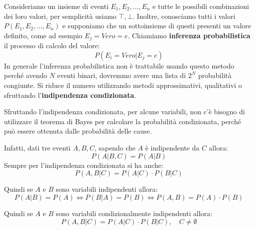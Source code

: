 Consideriamo un insieme di eventi $E_1, E_2, \dots, E_n$ e tutte le possibili
combinazioni dei loro valori, per semplicità usiamo $\top, \bot$. Inoltre,
conosciamo tutti i valori $P(E_1, E_2, \dots, E_n)$ e supponiamo che un
sottoinsieme di questi presenti un valore definito, come ad esempio $E_j = Vero
    = e$. Chiamiamo \textbf{inferenza probabilistica} il processo di calcolo del
valore:
\begin{equation}
    P(E_i = Vero|E_j=e)
\end{equation}
In generale l'inferenza probabilistica non è trattabile usando questo metodo
perché avendo $N$ eventi binari, dovremmo avere una lista di $2^N$ probabilità
congiunte. Si riduce il numero utilizzando metodi approssimativi, qualitativi o
sfruttando l'\textbf{indipendenza condizionata}.

Sfruttando l'indipendenza condizionata, per alcune variabili, non c'è bisogno di
utilizzare il teorema di Bayes per calcolare la probabilità condizionata, perché
può essere ottenuta dalle probabilità delle cause.

Infatti, dati tre eventi $A, B, C$, sapendo che $A$ è indipendente da $C$ allora:
\begin{equation*}
    P(A | B, C) = P(A | B)
\end{equation*}
Sempre per l'indipendenza condizionata si ha anche:
\begin{equation*}
    P(A, B | C) = P(A | C) \cdot P(B | C)
\end{equation*}
\begin{nota}
    Quindi se $A$ e $B$ sono variabili indipendenti allora:
    \begin{equation*}
        P(A|B) = P(A) \iff P(B|A) = P(B) \iff P(A,B) = P(A)\cdot P(B)
    \end{equation*}
\end{nota}
\begin{nota}
    Quindi se $A$ e $B$ sono variabili condizionalmente indipendenti allora:
    \begin{equation*}
        P(A,B|C) = P(A|C) \cdot P(B|C), \quad C \neq \emptyset
    \end{equation*}
\end{nota}